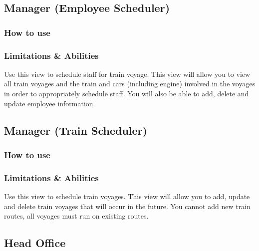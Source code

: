 \documentclass[letter]{article}
\begin{document}
\subsection{Manager (Employee Scheduler)}
\subsubsection{How to use}

\subsubsection{Limitations \& Abilities}
Use this view to schedule staff for train voyage. This view will allow you to view all train voyages and the train and cars (including engine) involved in the voyages in order to appropriately schedule staff. You will also be able to add, delete and update employee information.


\subsection{Manager (Train Scheduler)}
\subsubsection{How to use}

\subsubsection{Limitations \& Abilities}
Use this view to schedule train voyages. This view will allow you to add, update and delete train voyages that will occur in the future. You cannot add new train routes, all voyages must run on existing routes. 


\subsection{Head Office}
\end{document}
